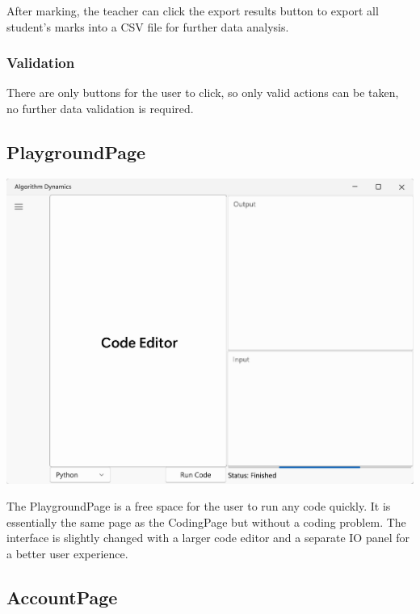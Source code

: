 \documentclass[a4paper]{report}
\begin{document}
After marking, the teacher can click the export results button to export all student's marks into a CSV file for further data analysis.

\subsubsection{Validation}

There are only buttons for the user to click, so only valid actions can be taken, no further data validation is required.

\subsection{PlaygroundPage}
\label{sec:PlaygroundPageDesign}

\includegraphics[width=\textwidth, height=\textheight, keepaspectratio]{PlaygroundPage-design}

The PlaygroundPage is a free space for the user to run any code quickly. It is essentially the same page as the CodingPage but without a coding problem. The interface is slightly changed with a larger code editor and a separate IO panel for a better user experience.

\subsection{AccountPage}
\label{sec:AccountPageDesign}
\end{document}
